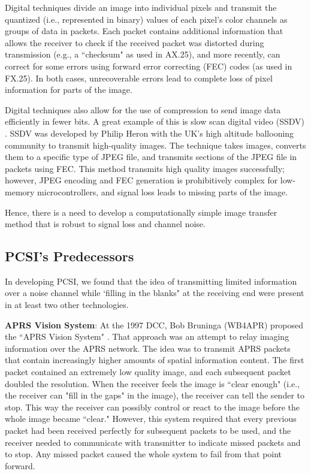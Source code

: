 \documentclass[letterpaper]{article}
\begin{document}
Digital techniques divide an image into individual pixels and transmit the quantized (i.e., represented in binary) values of each pixel's color channels as groups of data in packets. Each packet contains additional information that allows the receiver to check if the received packet was distorted during transmission (e.g., a ``checksum" as used in AX.25), and more recently, can correct for some errors using forward error correcting (FEC) codes (as used in FX.25). In both cases, unrecoverable errors lead to complete loss of pixel information for parts of the image.

Digital techniques also allow for the use of compression to send image data efficiently in fewer bits. A great example of this is slow scan digital video (SSDV) \cite{ssdvwebsite}. SSDV was developed by Philip Heron with the UK's high altitude ballooning community to transmit high-quality images. The technique takes images, converts them to a specific type of JPEG file, and transmits sections of the JPEG file in packets using FEC. This method transmits high quality images successfully; however, JPEG encoding and FEC generation is prohibitively complex for low-memory microcontrollers, and signal loss leads to missing parts of the image.

Hence, there is a need to develop a computationally simple image transfer method that is robust to signal loss and channel noise.


\subsection{PCSI's Predecessors}
In developing PCSI, we found that the idea of transmitting limited information over a noise channel while `filling in the blanks" at the receiving end were present in at least two other technologies.

\textbf{APRS Vision System}: At the 1997 DCC, Bob Bruninga (WB4APR) proposed the ``APRS Vision System" \cite{arpsvision}. That approach was an attempt to relay imaging information over the APRS network. The idea was to transmit APRS packets that contain increasingly higher amounts of spatial information content. The first packet contained an extremely low quality image, and each subsequent packet doubled the resolution. When the receiver feels the image is ``clear enough" (i.e., the receiver can "fill in the gaps" in the image), the receiver can tell the sender to stop. This way the receiver can possibly control or react to the image before the whole image became ``clear." However, this system required that every previous packet had been received perfectly for subsequent packets to be used, and the receiver needed to communicate with transmitter to indicate missed packets and to stop. Any missed packet caused the whole system to fail from that point forward.
\end{document}
